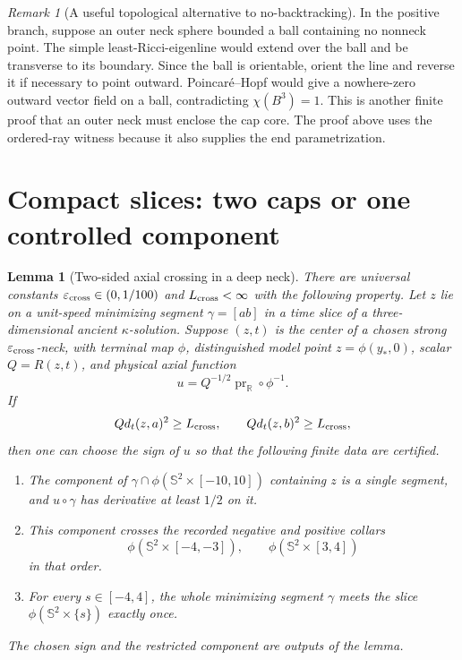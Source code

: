 \documentclass[10pt]{coll-l}
\newcommand{\Sph}{\mathbb{S}}
\newtheorem{lemma}[theorem]{Lemma}
\theoremstyle{definition}
\theoremstyle{remark}
\newtheorem{remark}[theorem]{Remark}
\numberwithin{section}{chapter}
\numberwithin{equation}{chapter}
\begin{document}
\begin{remark}[A useful topological alternative to no-backtracking]
\label{rem:ncs-cap-Poincare-Hopf}
In the positive branch, suppose an outer neck sphere bounded a ball
containing no nonneck point.  The simple least-Ricci-eigenline would extend
over the ball and be transverse to its boundary.  Since the ball is
orientable, orient the line and reverse it if necessary to point outward.
Poincar\'e--Hopf would give a nowhere-zero outward vector field on a ball,
contradicting $\chi(B^3)=1$.  This is another finite proof that an outer
neck must enclose the cap core.  The proof above uses the ordered-ray
witness because it also supplies the end parametrization.
\end{remark}

\section{Compact slices: two caps or one controlled component}
\label{sec:ncs-compact-structure}

\begin{lemma}[Two-sided axial crossing in a deep neck]
\label{lem:ncs-two-sided-axial-crossing}
There are universal constants
$\varepsilon_{\rm cross}\in(0,1/100)$ and
$L_{\rm cross}<\infty$ with the following property.  Let $z$ lie on a
unit-speed minimizing segment $\gamma=[ab]$ in a time slice of a
three-dimensional ancient $\kappa$-solution.  Suppose $(z,t)$ is the
center of a chosen strong $\varepsilon_{\rm cross}$-neck, with terminal
map $\phi$, distinguished model point $z=\phi(y_*,0)$, scalar
$Q=R(z,t)$, and physical axial function
\begin{equation}
 u=Q^{-1/2}\operatorname{pr}_{\mathbb R}\circ\phi^{-1}.       \label{eq:ncs-crossing-physical-axis}
\end{equation}
If
\begin{equation}
 Qd_t(z,a)^2\geq L_{\rm cross},
 \qquad Qd_t(z,b)^2\geq L_{\rm cross},                       \label{eq:ncs-two-sided-crossing-depth}
\end{equation}
then one can choose the sign of $u$ so that the following finite data are
certified.
\begin{enumerate}
\item The component of
      $\gamma\cap\phi(\Sph^2\times[-10,10])$ containing $z$ is a single
      segment, and $u\circ\gamma$ has derivative at least $1/2$ on it.
\item This component crosses the recorded negative and positive collars
      \begin{equation}
       \phi(\Sph^2\times[-4,-3]),\qquad
       \phi(\Sph^2\times[3,4])                         \label{eq:ncs-fixed-crossing-collars}
      \end{equation}
      in that order.
\item For every $s\in[-4,4]$, the whole minimizing segment $\gamma$
      meets the slice $\phi(\Sph^2\times\{s\})$ exactly once.
\end{enumerate}
The chosen sign and the restricted component are outputs of the lemma.
\end{lemma}
\end{document}
